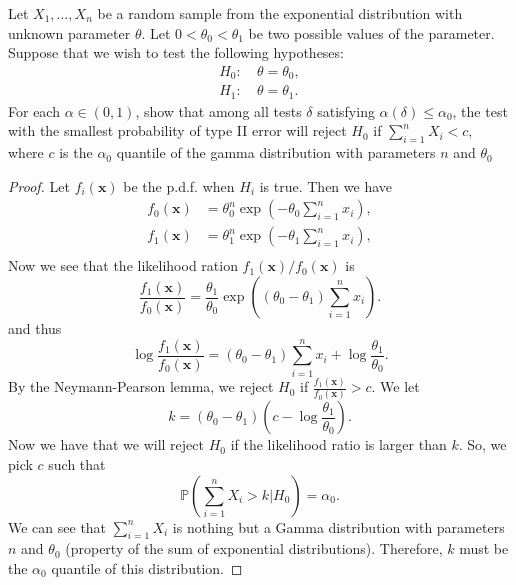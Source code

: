 \documentclass{article}
\renewcommand{\P}[1]{\mathbb{P}\left(#1\right)}
\newcommand{\randsamp}{X_1,\dots,X_n}
\newcommand{\pdf}{p.d.f. }
\newenvironment{hwproof}[1]
{
    #1
    \begin{proof}
}{
    \end{proof}
}
\begin{document}
\begin{hwproof}
    {
        Let $\randsamp$ be a random sample from the exponential distribution
        with unknown parameter $\theta$. Let $0 < \theta_0 < \theta_1$ be two
        possible values of the parameter. Suppose that we wish to test the
        following hypotheses:
        \begin{align*}
            H_0: & \ \theta = \theta_0, \\
            H_1: & \ \theta = \theta_1.
        \end{align*}
        For each $\alpha \in (0,1)$, show that among all tests $\delta$
        satisfying $\alpha(\delta) \leq \alpha_0$, the test with the
        smallest probability of type II error will reject $H_0$ if
        $\sum_{i=1}^n X_i < c$, where $c$ is the $\alpha_0$
        quantile of the gamma distribution with parameters
        $n$ and $\theta_0$
    }
    Let $f_i(\bm{x})$ be the \pdf when $H_i$ is true. Then we have
    \begin{align*}
        f_0(\bm{x}) & = \theta_0^n\exp\left(-\theta_0 \sum_{i=1}^n x_i\right), \\
        f_1(\bm{x}) & = \theta_1^n\exp\left(-\theta_1 \sum_{i=1}^n x_i\right), \\
    \end{align*}
    Now we see that the likelihood ration $f_1(\bm{x}) / f_0(\bm{x})$ is
    \begin{equation*}
        \frac{f_1(\bm{x})}{f_0(\bm{x})} =
        \frac{\theta_1}{\theta_0} \exp\left((\theta_0 - \theta_1) \sum_{i=1}^n x_i\right).
    \end{equation*}
    and thus
    \begin{equation*}
        \log\frac{f_1(\bm{x})}{f_0(\bm{x})} =
        (\theta_0 - \theta_1) \sum_{i=1}^n x_i + \log\frac{\theta_1}{\theta_0}.
    \end{equation*}
    By the Neymann-Pearson lemma, we reject $H_0$ if $\frac{f_1(\bm{x})}{f_0(\bm{x})} > c$.
    We let
    \begin{equation*}
        k = (\theta_0 - \theta_1)(c - \log\frac{\theta_1}{\theta_0}).
    \end{equation*}
    Now we have that we will reject $H_0$ if the likelihood ratio is larger than $k$. So,
    we pick $c$ such that
    \begin{equation*}
        \P{\sum_{i=1}^n X_i > k | H_0} = \alpha_0.
    \end{equation*}
    We can see that $\sum_{i=1}^n X_i$ is nothing but a Gamma distribution with parameters $n$
    and $\theta_0$ (property of the sum of exponential distributions). Therefore, $k$
    must be the $\alpha_0$ quantile of this distribution.

\end{hwproof}
\end{document}
